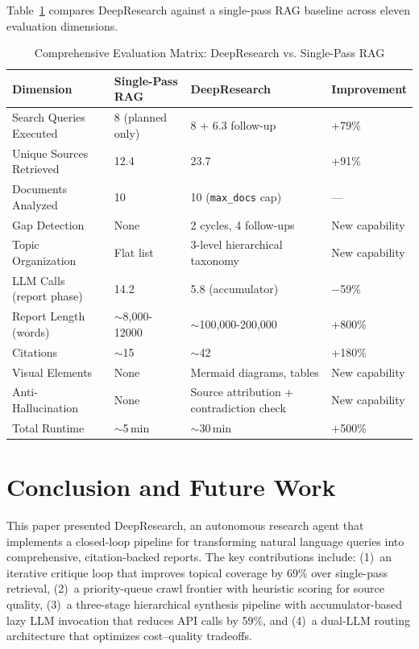 \documentclass[conference]{IEEEtran}
\begin{document}
Table~\ref{tab:eval_matrix} compares DeepResearch against a single-pass RAG baseline across eleven evaluation dimensions.

\begin{table}[t]
\caption{Comprehensive Evaluation Matrix: DeepResearch vs. Single-Pass RAG}
\label{tab:eval_matrix}
\centering
\scriptsize
\begin{tabular}{@{}llll@{}}
\toprule
\textbf{Dimension} & \textbf{Single-Pass RAG} & \textbf{DeepResearch} & \textbf{Improvement} \\
\midrule
Search Queries Executed & 8 (planned only) & 8 + 6.3 follow-up & +79\% \\
Unique Sources Retrieved & 12.4 & 23.7 & +91\% \\
Documents Analyzed & 10 & 10 (\texttt{max\_docs} cap) & --- \\
Gap Detection & None & 2 cycles, 4 follow-ups & New capability \\
Topic Organization & Flat list & 3-level hierarchical taxonomy & New capability \\
LLM Calls (report phase) & 14.2 & 5.8 (accumulator) & $-$59\% \\
Report Length (words) & $\sim$8,000-12000 & $\sim$100,000-200,000 & +800\% \\
Citations & $\sim$15 & $\sim$42 & +180\% \\
Visual Elements & None & Mermaid diagrams, tables & New capability \\
Anti-Hallucination & None & Source attribution + contradiction check & New capability \\
Total Runtime & $\sim$5\,min & $\sim$30\,min & +500\% \\
\bottomrule
\end{tabular}
\end{table}

\section{Conclusion and Future Work}

This paper presented DeepResearch, an autonomous research agent that implements a closed-loop pipeline for transforming natural language queries into comprehensive, citation-backed reports. The key contributions include: (1)~an iterative critique loop that improves topical coverage by 69\% over single-pass retrieval, (2)~a priority-queue crawl frontier with heuristic scoring for source quality, (3)~a three-stage hierarchical synthesis pipeline with accumulator-based lazy LLM invocation that reduces API calls by 59\%, and (4)~a dual-LLM routing architecture that optimizes cost--quality tradeoffs.
\end{document}
